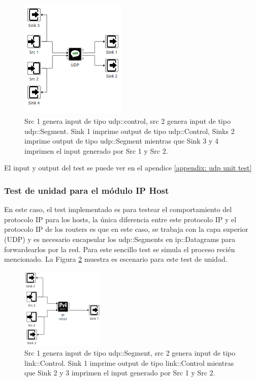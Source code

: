 \documentclass[10pt,a4paper]{article}
\begin{document}
\begin{figure}[!h]
    \centering
    \includegraphics[width = 0.45\textwidth]{img/png/unit_tests/udp.png}
    \caption{Src 1 genera input de tipo udp::control, src 2 genera input de tipo udp::Segment. Sink 1 imprime output de tipo udp::Control, Sinks 2 imprime output de tipo udp::Segment mientras que Sink 3 y 4 imprimen el input generado por Src 1 y Src 2.}
    \label{figure: unit test udp}
\end{figure}

El input y output del test se puede ver en el apendice \ref{appendix: udp unit test}

\newpage

\subsubsection{Test de unidad para el módulo IP Host}

En este caso, el test implementado es para testear el comportamiento del protocolo IP para los hosts, la única diferencia entre este protocolo IP y el protocolo IP de los routers es que en este caso, se trabaja con la capa superior (UDP) y es necesario encapsular los udp::Segments en ip::Datagrams para forwardearlos por la red. Para este sencillo test se simula el proceso recién mencionado. La Figura \ref{figure: unit test ip host} muestra es escenario para este test de unidad.

\begin{figure}[!h]
    \centering
    \includegraphics[width = 0.35\textwidth]{img/png/unit_tests/ip_host.png}
    \caption{Src 1 genera input de tipo udp::Segment, src 2 genera input de tipo link::Control. Sink 1 imprime output de tipo link::Control mientras que Sink 2 y 3 imprimen el input generado por Src 1 y Src 2.}
    \label{figure: unit test ip host}
\end{figure}
\end{document}

